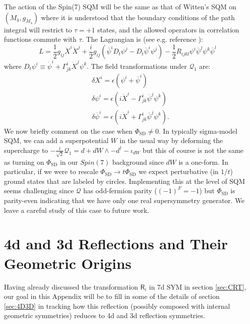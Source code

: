 \documentclass[12pt]{article}%
\numberwithin{equation}{section}
\renewcommand{\(}{\left(}
\renewcommand{\)}{\right)}
\renewcommand{\[}{\left[}
\renewcommand{\]}{\right]}
\begin{document}
The action of the Spin(7) SQM will be the same as that of Witten's SQM on $(M_4,g_{M_4})$ where it is understood that the boundary conditions of the path integral will restrict to $\tau=+1$ states, and the allowed operators in correlation functions commute with $\tau$.
The Lagrangian is (see e.g. reference \cite{Hori:2003ic}):
\begin{equation}
L=\frac{1}{2}g_{ij}\dot{X}^i\dot{X}^j+\frac{i}{2}g_{ij}(\overline{\psi}^iD_t\psi^j-D_t\overline{\psi}^i\psi^j)-\frac{1}{2}R_{ijkl}\psi^i\overline{\psi}^j\psi^k\overline{\psi}^l
\end{equation}
where $D_t\psi^i \equiv \dot{\psi}^i+\Gamma^i_{jk}\dot{X}^j\psi^k$. The field transformations under $\mathcal{Q}_1$ are:
\begin{align}
& \delta X^i  =\epsilon(\psi^i+\overline{\psi}^i) \\
& \delta \psi^i =\epsilon(i\dot{X}^i-\Gamma^i_{jk}\overline{\psi}^j\psi^k) \\
& \delta \overline{\psi}^i=\epsilon(i\dot{X}^i+\Gamma^i_{jk}\overline{\psi}^j\psi^k).
\end{align}
We now briefly comment on the case when $\Phi_{\mathrm{SD}}\neq0$. In typically sigma-model SQM, we can add a superpotential $W$ in the usual way by deforming the supercharge to $-\frac{i}{\sqrt{2}}\mathcal{Q}_1=d+dW\wedge-d^{\dagger}-\iota_{dW}$ but this of course is not the same as turning on $\Phi_{\mathrm{SD}}$ in our $Spin(7)$ background since $dW$ is a one-form. In particular, if we were to rescale $\Phi_{\mathrm{SD}}\rightarrow t\Phi_{\mathrm{SD}}$ we expect perturbative (in $1/t$) ground states that are labeled by circles. Implementing this at the level of SQM seems challenging since $\mathcal{Q}$ has odd-fermion parity ($(-1)^F=-1$) but $\Phi_{\mathrm{SD}}$ is parity-even indicating that we have only one real supersymmetry generator. We leave a careful study of this case to future work.

\section{4d and 3d Reflections and Their Geometric Origins}\label{app:CHARGEREF}
Having already discussed the transformation $\mathsf{R}_i$ in 7d SYM in section \ref{sec:CRT}, our goal in this Appendix will be
to fill in some of the details of section \ref{sec:4D3D} in tracking how this reflection
(possibly composed with internal geometric symmetries) reduces to 4d and 3d reflection symmetries.
\end{document}
